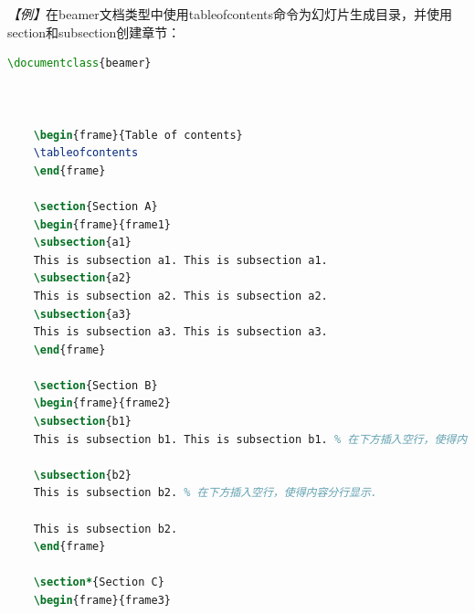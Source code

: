 \emph{【例】}在beamer文档类型中使用tableofcontents命令为幻灯片生成目录，并使用section和subsection创建章节：
\begin{lstlisting}[language=TeX]
    \documentclass{beamer}

    

    \begin{frame}{Table of contents}
    \tableofcontents
    \end{frame}

    \section{Section A}
    \begin{frame}{frame1}
    \subsection{a1}
    This is subsection a1. This is subsection a1.
    \subsection{a2}
    This is subsection a2. This is subsection a2.
    \subsection{a3}
    This is subsection a3. This is subsection a3.
    \end{frame}

    \section{Section B}
    \begin{frame}{frame2}
    \subsection{b1}
    This is subsection b1. This is subsection b1. % 在下方插入空行，使得内容分行显示.

    \subsection{b2}
    This is subsection b2. % 在下方插入空行，使得内容分行显示.

    This is subsection b2.
    \end{frame}

    \section*{Section C}
    \begin{frame}{frame3}

\end{lstlisting}

